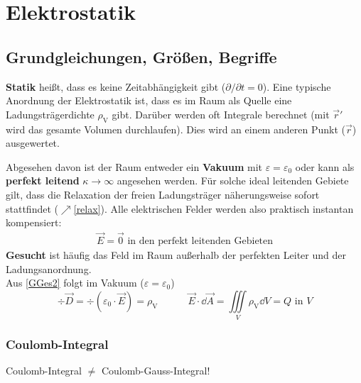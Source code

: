 \chapter{Elektrostatik}\label{es}
 \section{Grundgleichungen, Größen, Begriffe}
  	\textbf{Statik} heißt, dass es keine Zeitabhängigkeit gibt ($\partial/\partial t = 0$). Eine typische Anordnung der Elektrostatik ist, dass es im Raum als Quelle eine Ladungsträgerdichte $\rho_\text{V}$ gibt. Darüber werden oft Integrale berechnet (mit $\vec{r}'$ wird das gesamte Volumen durchlaufen). Dies wird an einem anderen Punkt ($\vec{r}$) ausgewertet. 
	  \begin{center}
		  
	  \end{center}
	  Abgesehen davon ist der Raum entweder ein \textbf{Vakuum} mit $\varepsilon=\varepsilon_{0}$
	  oder kann als \textbf{perfekt leitend} $\kappa \to\infty$ angesehen werden.
	   Für solche ideal leitenden Gebiete gilt, dass die Relaxation der freien Ladungsträger näherungsweise sofort stattfindet ($\nearrow$\ref{relax}). Alle elektrischen Felder werden also praktisch instantan kompensiert:
	  \begin{equation}\begin{split}
			  \vec{E}= \vec{0}\text{ in den perfekt leitenden Gebieten}
		  \end{split}\end{equation}
	  \textbf{Gesucht} ist häufig das Feld im Raum außerhalb der perfekten Leiter und der Ladungsanordnung.\\
Aus \ref{GGes2} folgt im Vakuum ($\varepsilon=\varepsilon_{0}$)
\begin{equation}
			  \div \vec{D}  = \div \left( \varepsilon_0 \cdot \vec{E} \right) = \rho_\text{V} \quad\quad\quad \vec{E} \cdot \dd\vec{A}              =
			  \iiint\limits_{V} \rho_\text{V} \dd V
			  = Q \text{ in }V
\end{equation}
  \subsection{Coulomb-Integral}
  Coulomb-Integral $\neq$ Coulomb-Gauss-Integral!
